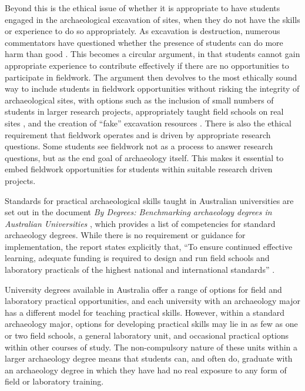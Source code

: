	Beyond this is the ethical issue of whether it is appropriate to have students engaged in the archaeological excavation of sites, when they do not have the skills or experience to do so appropriately. 
	As excavation is destruction, numerous commentators have questioned whether the presence of students can do more harm than good \parencites[48]{hall2005}[216]{pyburn2003}. 
	This becomes a circular argument, in that students cannot gain appropriate experience to contribute effectively if there are no opportunities to participate in fieldwork. 
	The argument then devolves to the most ethically sound way to include students in fieldwork opportunities without risking the integrity of archaeological sites, with options such as the inclusion of small numbers of students in larger research projects, appropriately taught field schools on real sites \parencite{mytum2012c}, 
	and the creation of “fake” excavation resources \parencites{cosgrove2013}{hall2005}. 
	There is also the ethical requirement that fieldwork operates and is driven by appropriate research questions. Some students see fieldwork not as a process to answer research questions, but as the end goal of archaeology itself. 
	This makes it essential to embed fieldwork opportunities for students within suitable research driven projects.
	
	Standards for practical archaeological skills taught in Australian universities are set out in the document \emph{By Degrees: Benchmarking archaeology degrees in Australian Universities} 
	\parencite{beck2008}, which provides a list of competencies for standard archaeology degrees. While there is no requirement or guidance for implementation, the report states explicitly that, 
	\enquote{To ensure continued effective learning, adequate funding is required to design and run field schools and laboratory practicals of the highest national and international standards} \parencite[9]{beck2008}.
	
	University degrees available in Australia offer a range of options for field and laboratory practical opportunities, and each university with an archaeology major has a different model for teaching practical skills.
	However, within a standard archaeology major, options for developing practical skills may lie in as few as one or two field schools, a general laboratory unit, and occasional practical options within other courses of study. 
	The non-compulsory nature of these units within a larger archaeology degree means that students can, and often do, graduate with an archaeology degree in which they have had no real exposure to any form of field or laboratory training.
	
